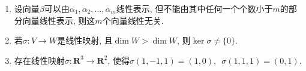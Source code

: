 \begin{enumerate}
\begin{enumerate}
              \item 设向量\(\beta\)可以由\(\alpha_1,\alpha_2,\ldots,\alpha_{m}\)线性表示, 但不能由其中任何一个个数小于\(m\)的部分向量线性表示, 则这\(m\)个向量线性无关.

              \item 若\(\sigma\colon V \to W\)是线性映射, 且\(\dim W > \dim W\), 则\(\ker\sigma \neq \{ 0 \}\).

              \item 存在线性映射\(\sigma\colon \mathbf{R}^3 \to \mathbf{R}^2\), 使得\(\sigma(1, - 1,1) = (1,0),\enspace \sigma(1,1,1) = (0,1)\).
          \end{enumerate}
\end{enumerate}

\clearpage

